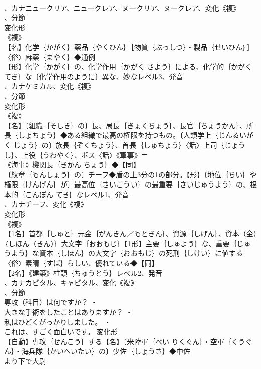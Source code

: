 \documentclass[8pt]{extreport}
\begin{document}
\begin{CJK}{UTF8}{min}
\\	、カナニュークリア、ニュークレア、ヌークリア、ヌークレア、変化《複》
\\	、分節
\\	変化形 
\\	《複》
\\	【名】化学｛かがく｝薬品｛やくひん｝［物質｛ぶっしつ｝・製品｛せいひん｝］〈俗〉麻薬｛まやく｝◆通例
\\	【形】化学｛かがく｝の、化学作用｛かがく さよう｝による、化学的｛かがくてき｝な〔化学作用のように〕異な、妙なレベル3、発音
\\	、カナケミカル、変化《複》
\\	、分節
\\	変化形 
\\	《複》
\\	【名】〔組織｛そしき｝の〕長、局長｛きょくちょう｝、長官｛ちょうかん｝、所長｛しょちょう｝◆ある組織で最高の権限を持つもの。〔人類学上｛じんるいがく じょう｝の〕族長｛ぞくちょう｝、首長｛しゅちょう｝〈話〉上司｛じょうし｝、上役｛うわやく｝、ボス〈話〉《軍事》＝
\\	《海事》機関長｛きかん ちょう｝◆【同】
\\	〔紋章｛もんしょう｝の〕チーフ◆盾の上3分の1の部分。【形】〔地位｛ちい｝や権限｛けんげん｝が〕最高位｛さいこうい｝の最重要｛さいじゅうよう｝の、根本的｛こんぽん てき｝なレベル1、発音
\\	、カナチーフ、変化《複》
\\	変化形 
\\	《複》
\\	【1名】首都｛しゅと｝元金｛がんきん／もときん｝、資源｛しげん｝、資本（金）｛しほん（きん）｝大文字｛おおもじ｝【1形】主要｛しゅよう｝な、重要｛じゅうよう｝な資本｛しほん｝の大文字｛おおもじ｝の死刑｛しけい｝に値する〈俗〉素晴｛すば｝らしい、優れている◆【同】
\\	【2名】《建築》柱頭｛ちゅうとう｝レベル2、発音
\\	、カナカピタル、キャピタル、変化《複》
\\	、分節
\\	専攻（科目）は何ですか？ ・
\\	大きな手術をしたことはありますか？ ・
\\	私はひどくがっかりしました。 ・
\\	これは、すごく面白いです。	変化形 
\\	【自動】専攻｛せんこう｝する【名】〔米陸軍｛べい りくぐん｝・空軍｛くうぐん｝・海兵隊｛かいへいたい｝の〕少佐｛しょうさ｝◆中佐
\\	より下で大尉

\end{CJK}
\end{document}
